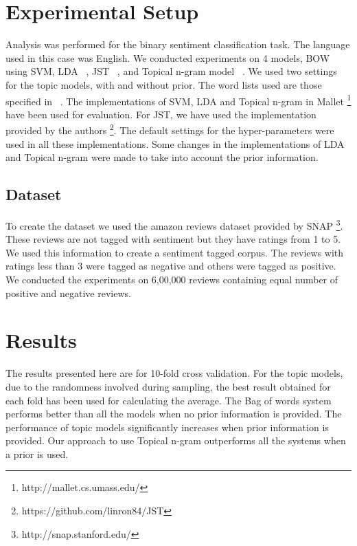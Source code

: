\documentclass[11pt]{article}
\begin{document}
\section{Experimental Setup}\label{experiments}

Analysis was performed for the binary sentiment classification task. The language used in this case was English.
We conducted experiments on 4 models, BOW using SVM, LDA ~\cite{blei2003latent}, JST ~\cite{lin2009joint}, and 
Topical n-gram model ~\cite{wang2007topical}. We used two settings for the topic models, with and without prior. 
The word lists used are those specified in ~\cite{liu2010sentiment}. The implementations of SVM, LDA and Topical
n-gram in Mallet \footnote{http://mallet.cs.umass.edu/} have been used for evaluation. For JST, we have used the 
implementation provided by the authors \footnote{https://github.com/linron84/JST}. The default settings for the
hyper-parameters were used in all these implementations. Some changes in the implementations of LDA and Topical
n-gram were made to take into account the prior information.

\subsection*{Dataset}

To create the dataset we used the amazon reviews dataset provided by SNAP \footnote{http://snap.stanford.edu/}.
These reviews are not tagged with sentiment but they have ratings from 1 to 5. We used this information to create
a sentiment tagged corpus. The reviews with ratings less than 3 were tagged as negative and others were tagged
as positive. We conducted the experiments on 6,00,000 reviews containing equal number of positive and negative
reviews.

\section{Results}\label{results}

The results presented here are for 10-fold cross validation. For the topic models, due to the randomness involved 
during sampling, the best result obtained for each fold has been used for calculating the average. The Bag of words 
system performs better than all the models when no prior information is provided. The performance of topic models 
significantly increases when prior information is provided. Our approach to use Topical n-gram outperforms all the 
systems when a prior is used.
\end{document}
